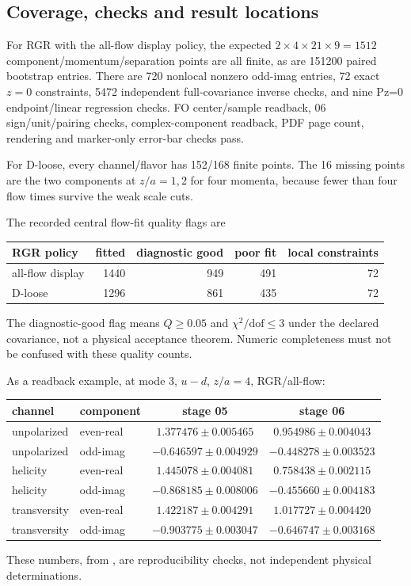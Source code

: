 \documentclass[11pt]{article}
\numberwithin{equation}{section}
\begin{document}
\subsection{Coverage, checks and result locations}

For RGR with the all-flow display policy, the expected \(2\times4\times21
\times9=1512\) component/momentum/separation points are all finite, as are
151200 paired bootstrap entries.  There are 720 nonlocal nonzero odd-imag
entries, 72 exact \(z=0\) constraints, 5472 independent full-covariance
inverse checks, and nine Pz=0 endpoint/linear regression checks.  FO
center/sample readback, 06 sign/unit/pairing checks, complex-component
readback, PDF page count, rendering and marker-only error-bar checks pass.

For D-loose, every channel/flavor has 152/168 finite points.  The 16
missing points are the two components at \(z/a=1,2\) for four momenta,
because fewer than four flow times survive the weak scale cuts.

The recorded central flow-fit quality flags are
\begin{center}
\begin{tabular}{@{}lrrrr@{}}
\toprule
RGR policy & fitted & diagnostic good & poor fit & local constraints\\
\midrule
all-flow display & 1440 & 949 & 491 & 72\\
D-loose & 1296 & 861 & 435 & 72\\
\bottomrule
\end{tabular}
\end{center}
The diagnostic-good flag means \(Q\ge0.05\) and
\(\chi^2/\mathrm{dof}\le3\) under the declared covariance, not a
physical acceptance theorem.  Numeric completeness must not be confused
with these quality counts.

As a readback example, at mode 3, \(u-d\), \(z/a=4\), RGR/all-flow:
\begin{center}
\begin{tabular}{@{}llcc@{}}
\toprule
channel & component & stage 05 & stage 06\\
\midrule
unpolarized & even-real & \(1.377476\pm0.005465\) & \(0.954986\pm0.004043\)\\
unpolarized & odd-imag & \(-0.646597\pm0.004929\) & \(-0.448278\pm0.003523\)\\
helicity & even-real & \(1.445078\pm0.004081\) & \(0.758438\pm0.002115\)\\
helicity & odd-imag & \(-0.868185\pm0.008006\) & \(-0.455660\pm0.004183\)\\
transversity & even-real & \(1.422187\pm0.004291\) & \(1.017727\pm0.004420\)\\
transversity & odd-imag & \(-0.903775\pm0.003047\) & \(-0.646747\pm0.003168\)\\
\bottomrule
\end{tabular}
\end{center}
These numbers, from , are reproducibility checks, not
independent physical determinations.
\end{document}
